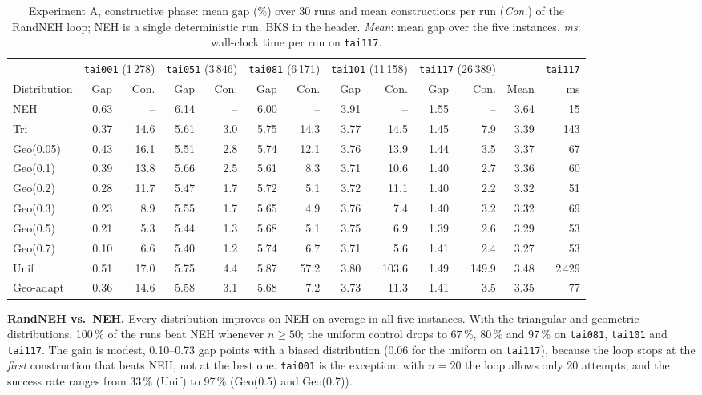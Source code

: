 \documentclass[10pt,a4paper]{article}
\begin{document}
\begin{table}[!t]
\centering
\caption{Experiment A, constructive phase: mean gap (\%) over 30 runs and mean constructions per run
(\emph{Con.}) of the RandNEH loop; NEH is a single deterministic run. BKS in the header. \emph{Mean}:
mean gap over the five instances. \emph{ms}: wall-clock time per run on \texttt{tai117}.}
\label{tab:results}
\scriptsize
\setlength{\tabcolsep}{4pt}
\begin{tabular}{@{}lrrrrrrrrrrrr@{}}
\toprule
 & \multicolumn{2}{c}{\texttt{tai001} (1\,278)} & \multicolumn{2}{c}{\texttt{tai051} (3\,846)}
 & \multicolumn{2}{c}{\texttt{tai081} (6\,171)} & \multicolumn{2}{c}{\texttt{tai101} (11\,158)}
 & \multicolumn{2}{c}{\texttt{tai117} (26\,389)} & & \texttt{tai117} \\
Distribution & Gap & Con. & Gap & Con. & Gap & Con. & Gap & Con. & Gap & Con. & Mean & ms \\
\midrule
NEH       & 0.63 & --   & 6.14 & --  & 6.00 & --   & 3.91 & --    & 1.55 & --    & 3.64 & 15 \\
Tri       & 0.37 & 14.6 & 5.61 & 3.0 & 5.75 & 14.3 & 3.77 & 14.5  & 1.45 & 7.9   & 3.39 & 143 \\
Geo(0.05) & 0.43 & 16.1 & 5.51 & 2.8 & 5.74 & 12.1 & 3.76 & 13.9  & 1.44 & 3.5   & 3.37 & 67 \\
Geo(0.1)  & 0.39 & 13.8 & 5.66 & 2.5 & 5.61 & 8.3  & 3.71 & 10.6  & 1.40 & 2.7   & 3.36 & 60 \\
Geo(0.2)  & 0.28 & 11.7 & 5.47 & 1.7 & 5.72 & 5.1  & 3.72 & 11.1  & 1.40 & 2.2   & 3.32 & 51 \\
Geo(0.3)  & 0.23 & 8.9  & 5.55 & 1.7 & 5.65 & 4.9  & 3.76 & 7.4   & 1.40 & 3.2   & 3.32 & 69 \\
Geo(0.5)  & 0.21 & 5.3  & 5.44 & 1.3 & 5.68 & 5.1  & 3.75 & 6.9   & 1.39 & 2.6   & 3.29 & 53 \\
Geo(0.7)  & 0.10 & 6.6  & 5.40 & 1.2 & 5.74 & 6.7  & 3.71 & 5.6   & 1.41 & 2.4   & 3.27 & 53 \\
Unif      & 0.51 & 17.0 & 5.75 & 4.4 & 5.87 & 57.2 & 3.80 & 103.6 & 1.49 & 149.9 & 3.48 & 2\,429 \\
Geo-adapt & 0.36 & 14.6 & 5.58 & 3.1 & 5.68 & 7.2  & 3.73 & 11.3  & 1.41 & 3.5   & 3.35 & 77 \\
\bottomrule
\end{tabular}
\end{table}

\textbf{RandNEH vs.\ NEH.} Every distribution improves on NEH on average in all five instances. With
the triangular and geometric distributions, 100\,\% of the runs beat NEH whenever $n\ge50$; the uniform
control drops to 67\,\%, 80\,\% and 97\,\% on \texttt{tai081}, \texttt{tai101} and \texttt{tai117}. The
gain is modest, 0.10--0.73 gap points with a biased distribution (0.06 for the uniform on
\texttt{tai117}), because the loop stops at the \emph{first} construction that beats NEH, not at the best
one. \texttt{tai001} is the exception: with $n=20$ the loop allows only 20 attempts, and the success
rate ranges from 33\,\% (Unif) to 97\,\% (Geo(0.5) and Geo(0.7)).
\end{document}

